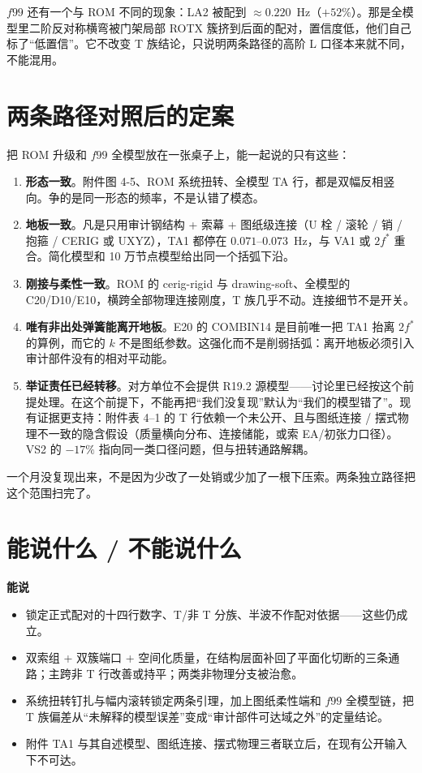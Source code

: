 \documentclass[11pt,a4paper]{ctexart}
\begin{document}
$f99$ 还有一个与 ROM 不同的现象：LA2 被配到 $\approx0.220$~Hz（$+52\%$）。那是全模型里二阶反对称横弯被门架局部 ROTX 簇挤到后面的配对，置信度低，他们自己标了``低置信''。它不改变 T 族结论，只说明两条路径的高阶 L 口径本来就不同，不能混用。

\section{两条路径对照后的定案}

把 ROM 升级和 $f99$ 全模型放在一张桌子上，能一起说的只有这些：

\begin{enumerate}
  \item \textbf{形态一致}。附件图 4-5、ROM 系统扭转、全模型 TA 行，都是双幅反相竖向。争的是同一形态的频率，不是认错了模态。
  \item \textbf{地板一致}。凡是只用审计钢结构 + 索幕 + 图纸级连接（U 栓 / 滚轮 / 销 / 抱箍 / CERIG 或 UXYZ），TA1 都停在 $0.071$--$0.073$~Hz，与 VA1 或 $2f^\ast$ 重合。简化模型和 10 万节点模型给出同一个括弧下沿。
  \item \textbf{刚接与柔性一致}。ROM 的 cerig-rigid 与 drawing-soft、全模型的 C20/D10/E10，横跨全部物理连接刚度，T 族几乎不动。连接细节不是开关。
  \item \textbf{唯有非出处弹簧能离开地板}。E20 的 COMBIN14 是目前唯一把 TA1 抬离 $2f^\ast$ 的算例，而它的 $k$ 不是图纸参数。这强化而不是削弱括弧：离开地板必须引入审计部件没有的相对平动能。
  \item \textbf{举证责任已经转移}。对方单位不会提供 R19.2 源模型——讨论里已经按这个前提处理。在这个前提下，不能再把``我们没复现''默认为``我们的模型错了''。现有证据更支持：附件表 4--1 的 T 行依赖一个未公开、且与图纸连接 / 摆式物理不一致的隐含假设（质量横向分布、连接储能，或索 EA/初张力口径）。VS2 的 $-17\%$ 指向同一类口径问题，但与扭转通路解耦。
\end{enumerate}

一个月没复现出来，不是因为少改了一处销或少加了一根下压索。两条独立路径把这个范围扫完了。

\section{能说什么 / 不能说什么}

\textbf{能说}
\begin{itemize}
  \item 锁定正式配对的十四行数字、T/非 T 分族、半波不作配对依据——这些仍成立。
  \item 双索组 + 双簇端口 + 空间化质量，在结构层面补回了平面化切断的三条通路；主跨非 T 行改善或持平；两类非物理分支被治愈。
  \item 系统扭转钉扎与幅内滚转锁定两条引理，加上图纸柔性端和 $f99$ 全模型链，把 T 族偏差从``未解释的模型误差''变成``审计部件可达域之外''的定量结论。
  \item 附件 TA1 与其自述模型、图纸连接、摆式物理三者联立后，在现有公开输入下不可达。
\end{itemize}
\end{document}
